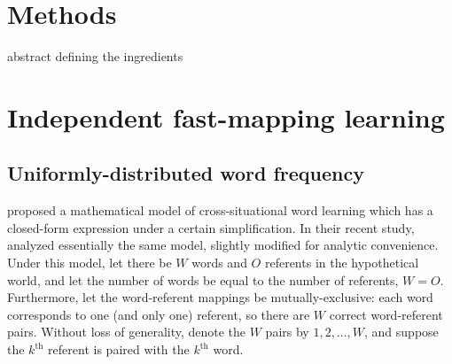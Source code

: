 \documentclass[a4paper,natbib,man]{apa6}
\begin{document}

\section{Methods}
abstract defining the ingredients

\section{Independent fast-mapping learning}

\subsection{Uniformly-distributed word frequency}
\cite{Blythe:2010} proposed a mathematical model of cross-situational word learning which has a closed-form expression under a certain simplification.
In their recent study, \cite{Blythe:2016} analyzed essentially the same model, slightly modified for analytic convenience.
Under this model, let there be $W$ words and $O$ referents in the hypothetical world, and let the number of words be equal to the number of referents, $W = O$. 
Furthermore, let the word-referent mappings be mutually-exclusive: each word corresponds to one (and only one) referent, so there are $W$ correct word-referent pairs.
Without loss of generality, denote the $W$ pairs by $1, 2, \ldots, W$, and suppose the $k^{\text{th}}$ referent is paired with the $k^{\text{th}}$ word.
\end{document}
